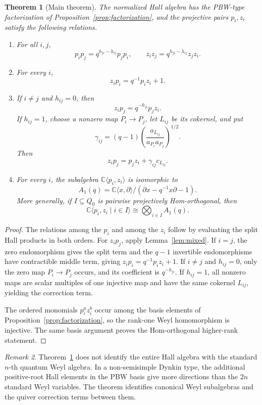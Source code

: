 \documentclass[12pt]{article}
\theoremstyle{plain}
\newtheorem{theorem}{Theorem}[section]
\theoremstyle{remark}
\newtheorem{remark}[theorem]{Remark}
\begin{document}
\begin{theorem}[Main theorem]\label{thm:main}
The normalized Hall algebra has the PBW-type factorization of
Proposition~\ref{prop:factorization}, and the projective pairs $p_i,z_i$
satisfy the following relations.
\begin{enumerate}[label=\rm(\alph*)]
\item For all $i,j$,
\[
 p_ip_j=q^{h_{ji}-h_{ij}}p_jp_i,
 \qquad
 z_iz_j=q^{h_{ji}-h_{ij}}z_jz_i.
\]
\item For every $i$,
\[
 z_ip_i=q^{-1}p_iz_i+1.
\]
\item If $i\ne j$ and $h_{ij}=0$, then
\[
 z_ip_j=q^{-h_{ji}}p_jz_i.
\]
If $h_{ij}=1$, choose a nonzero map $P_i\to P_j$, let $L_{ij}$ be its
cokernel, and put
\[
 \gamma_{ij}=(q-1)
 \left(\frac{a_{L_{ij}}}{a_{P_i}a_{P_j}}\right)^{1/2}.
\]
Then
\[
 z_ip_j=p_jz_i+\gamma_{ij}c_{L_{ij}}.
\]
\item For every $i$, the subalgebra $\mathbb C\langle p_i,z_i\rangle$ is
isomorphic to
\[
 A_1(q)=\mathbb C\langle x,\partial\rangle/
 (\partial x-q^{-1}x\partial-1).
\]
More generally, if $I\subseteq Q_0$ is pairwise projectively
Hom-orthogonal, then
\[
 \mathbb C\langle p_i,z_i\mid i\in I\rangle
 \cong\bigotimes_{i\in I}A_1(q).
\]
\end{enumerate}
\end{theorem}

\begin{proof}
The relations among the $p_i$ and among the $z_i$ follow by evaluating the
split Hall products in both orders. For $z_ip_j$, apply
Lemma~\ref{lem:mixed}. If $i=j$, the zero endomorphism gives the split term
and the $q-1$ invertible endomorphisms have contractible middle term, giving
$z_ip_i=q^{-1}p_iz_i+1$. If $i\ne j$ and $h_{ij}=0$, only the zero map
$P_i\to P_j$ occurs, and its coefficient is $q^{-h_{ji}}$. If $h_{ij}=1$,
all nonzero maps are scalar multiples of one injective map and have the same
cokernel $L_{ij}$, yielding the correction term.

The ordered monomials $p_i^az_i^b$ occur among the basis elements of
Proposition~\ref{prop:factorization}, so the rank-one Weyl homomorphism is
injective. The same basis argument proves the Hom-orthogonal higher-rank
statement.
\end{proof}

\begin{remark}
Theorem~\ref{thm:main} does not identify the entire Hall algebra with the
standard $n$-th quantum Weyl algebra. In a non-semisimple Dynkin type, the
additional positive-root Hall elements in the PBW basis give more directions
than the $2n$ standard Weyl variables. The theorem identifies canonical Weyl
subalgebras and the quiver correction terms between them.
\end{remark}
\end{document}
